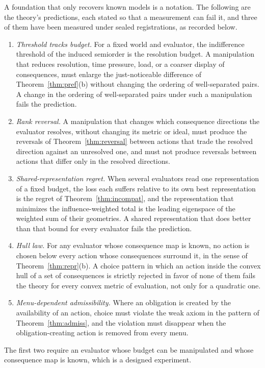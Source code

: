 \documentclass[11pt]{article}
\theoremstyle{definition}
\theoremstyle{remark}
\begin{document}
A foundation that only recovers known models is a notation.
The following are the theory's predictions, each stated so that a measurement can fail it, and three of them have been measured under sealed registrations, as recorded below.
\begin{enumerate}
\item[(i)] \emph{Threshold tracks budget.} For a fixed world and evaluator, the indifference threshold of the induced semiorder is the resolution budget. A manipulation that reduces resolution, time pressure, load, or a coarser display of consequences, must enlarge the just-noticeable difference of Theorem~\ref{thm:pref}(b) without changing the ordering of well-separated pairs. A change in the ordering of well-separated pairs under such a manipulation fails the prediction.
\item[(ii)] \emph{Rank reversal.} A manipulation that changes which consequence directions the evaluator resolves, without changing its metric or ideal, must produce the reversals of Theorem~\ref{thm:reversal} between actions that trade the resolved direction against an unresolved one, and must not produce reversals between actions that differ only in the resolved directions.
\item[(iii)] \emph{Shared-representation regret.} When several evaluators read one representation of a fixed budget, the loss each suffers relative to its own best representation is the regret of Theorem~\ref{thm:incompat}, and the representation that minimizes the influence-weighted total is the leading eigenspace of the weighted sum of their geometries. A shared representation that does better than that bound for every evaluator fails the prediction.
\item[(iv)] \emph{Hull law.} For any evaluator whose consequence map is known, no action is chosen below every action whose consequences surround it, in the sense of Theorem~\ref{thm:repr}(b). A choice pattern in which an action inside the convex hull of a set of consequences is strictly rejected in favor of none of them fails the theory for every convex metric of evaluation, not only for a quadratic one.
\item[(v)] \emph{Menu-dependent admissibility.} Where an obligation is created by the availability of an action, choice must violate the weak axiom in the pattern of Theorem~\ref{thm:admiss}, and the violation must disappear when the obligation-creating action is removed from every menu.
\end{enumerate}
The first two require an evaluator whose budget can be manipulated and whose consequence map is known, which is a designed experiment.
\end{document}
